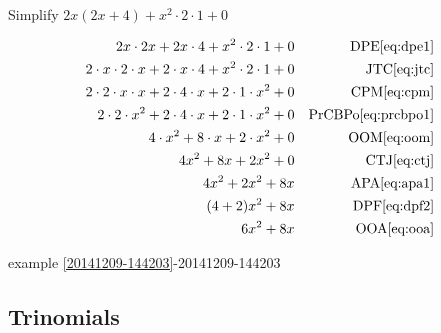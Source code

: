 \documentclass[20150903-160354-rs2.2-MarksMathNotebook.tex]{subfiles}
\begin{document}
\begin{example}[id:20141209-145211] \label{20141209-145211} \hfill \\

Simplify $2x(2x+4)+x^2 \cdot 2 \cdot 1 + 0$

\soln

\solnsteps
\begin{align*}
2x \cdot 2x + 2x \cdot 4 + x^2 \cdot 2 \cdot 1 + 0 && \text{DPE} \eqref{eq:dpe1} \\
2 \cdot x \cdot 2 \cdot x + 2 \cdot x \cdot 4 + x^2 \cdot 2 \cdot 1 + 0 && \text{JTC} \eqref{eq:jtc} \\
2 \cdot 2 \cdot x \cdot x + 2 \cdot 4 \cdot x + 2 \cdot 1 \cdot x^2 + 0 && \text{CPM} \eqref{eq:cpm} \\
2 \cdot 2 \cdot x^2 + 2 \cdot 4 \cdot x + 2 \cdot 1 \cdot x^2 + 0 && \text{PrCBPo} \eqref{eq:prcbpo1} \\
4 \cdot x^2 + 8 \cdot x + 2 \cdot x^2 + 0 && \text{OOM} \eqref{eq:oom} \\
4 x^2 +8x + 2x^2 + 0 && \text{CTJ} \eqref{eq:ctj} \\
4x^2 + 2x^2 + 8x && \text{APA} \eqref{eq:apa1} \\
(4+2)x^2 +8x && \text{DPF} \eqref{eq:dpf2} \\
6x^2+8x && \text{OOA} \eqref{eq:ooa}
\end{align*}

\qdepend

\qdependlist
example \ref{20141209-144203}-20141209-144203
\end{example}

\subsection*{Trinomials}
\end{document}
